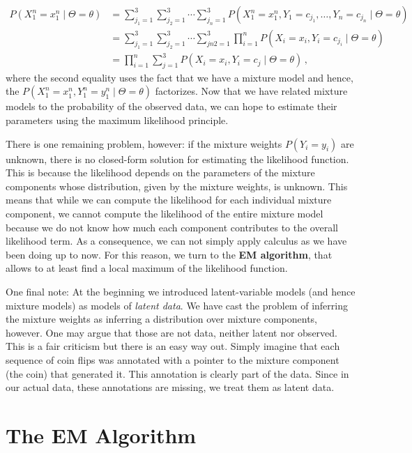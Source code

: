 \begin{align}
P(X_1^n=x_{1}^{n} \mid \Theta= \theta) &= \sum_{j_1=1}^3 \sum_{j_2=1}^3 \cdots \sum_{j_n=1}^3 P(X_1^n=x_{1}^{n}, Y_1=c_{j_1}, \ldots, Y_n=c_{j_n} \mid \Theta= \theta) \label{eq:marginal} \\
&= \sum_{j_1=1}^3 \sum_{j_2=1}^3 \cdots \sum_{jn2=1}^3 \prod_{i=1}^{n} P(X_{i}=x_{i},Y_{i}=c_{j_i} \mid  \Theta= \theta) \nonumber \\
&= \prod_{i=1}^{n} \sum_{j=1}^3 P(X_{i}=x_{i},Y_{i}=c_{j} \mid  \Theta= \theta) \, , \nonumber
\end{align}
where the second equality uses the fact that we have a mixture model and hence, the $P(X_1^n=x_1^n, Y_1^n=y_1^n \mid \Theta = \theta)$ factorizes.
Now that we have related mixture models to the probability of the observed data, we can hope to estimate
their parameters using the maximum likelihood principle.

There is one remaining problem, however: if the mixture weights $P(Y_i=y_i)$ are unknown, there is no closed-form solution for estimating the likelihood function. This is because
the likelihood depends on the parameters of the mixture components whose distribution, given
by the mixture weights, is unknown. This means that while we can compute the likelihood for each
individual mixture component, we cannot compute the likelihood of the entire mixture model because we
do not know how much each component contributes to the overall likelihood term. As a consequence, we can not 
simply apply calculus as we have been doing up to now. For this reason, we turn to the \textbf{EM algorithm}, 
that allows to at least find a local maximum of the likelihood function.

One final note: At the beginning we introduced latent-variable models (and hence mixture models) as models
of \textit{latent data}. We have cast the problem of inferring the mixture weights as inferring a 
distribution over mixture components, however. One may argue that those are not data, neither latent nor 
observed. This is a fair criticism but there is an easy way out. Simply imagine that each sequence of coin
flips was annotated with a pointer to the mixture component (the coin) that generated it. This annotation
is clearly part of the data. Since in our actual data, these annotations are missing, we treat them as 
latent data.

\section{The EM Algorithm}


